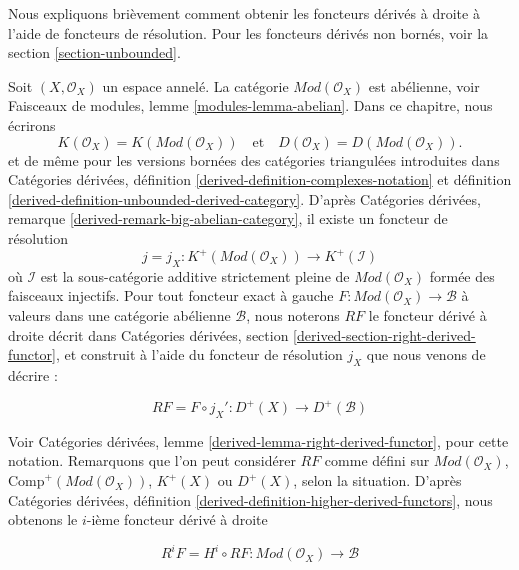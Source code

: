 \label{section-derived-functors}

\noindent
Nous expliquons brièvement comment obtenir les foncteurs dérivés à droite à l'aide de foncteurs de résolution. Pour les foncteurs dérivés non bornés, voir la section \ref{section-unbounded}.

\medskip\noindent

Soit $(X, \mathcal{O}_X)$ un espace annelé. La catégorie
$\textit{Mod}(\mathcal{O}_X)$ est abélienne, voir Faisceaux de modules, lemme \ref{modules-lemma-abelian}. Dans ce chapitre, nous écrirons
$$
K(\mathcal{O}_X) = K(\textit{Mod}(\mathcal{O}_X))
\quad
\text{et}
\quad
D(\mathcal{O}_X) = D(\textit{Mod}(\mathcal{O}_X)).
$$
et de même pour les versions bornées des catégories triangulées introduites dans Catégories dérivées, définition \ref{derived-definition-complexes-notation} et définition \ref{derived-definition-unbounded-derived-category}. D'après Catégories dérivées, remarque \ref{derived-remark-big-abelian-category},
il existe un foncteur de résolution
$$
j = j_X :
K^{+}(\textit{Mod}(\mathcal{O}_X))
\longrightarrow
K^{+}(\mathcal{I})
$$
où $\mathcal{I}$ est la sous-catégorie additive strictement pleine de
$\textit{Mod}(\mathcal{O}_X)$ formée des faisceaux injectifs. Pour tout foncteur exact à gauche
$F : \textit{Mod}(\mathcal{O}_X) \to \mathcal{B}$
à valeurs dans une catégorie abélienne $\mathcal{B}$, nous noterons $RF$ le foncteur dérivé à droite décrit dans Catégories dérivées, section \ref{derived-section-right-derived-functor},
et construit à l'aide du foncteur de résolution $j_X$ que nous venons de décrire :

\begin{equation}
\label{equation-RF}
RF = F \circ j_X' : D^{+}(X) \longrightarrow D^{+}(\mathcal{B})
\end{equation}

Voir Catégories dérivées, lemme \ref{derived-lemma-right-derived-functor},
pour cette notation. Remarquons que l'on peut considérer $RF$ comme défini sur
$\textit{Mod}(\mathcal{O}_X)$,
$\text{Comp}^{+}(\textit{Mod}(\mathcal{O}_X))$,
$K^{+}(X)$ ou $D^{+}(X)$,
selon la situation. D'après Catégories dérivées, définition \ref{derived-definition-higher-derived-functors},
nous obtenons le $i$-ième foncteur dérivé à droite

\begin{equation}
\label{equation-RFi}
R^iF = H^i \circ RF : \textit{Mod}(\mathcal{O}_X) \longrightarrow \mathcal{B}
\end{equation}

